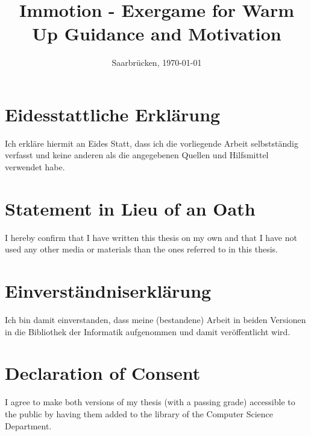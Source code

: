 \documentclass[11pt, a4paper, twoside]{Thesis}
\date{\displaydate{date1}}
\date{\displaydate{date2}}
\begin{document}




\frontmatter

\title  {Immotion - Exergame for Warm Up Guidance and Motivation}

\addresses  {\groupname\\\deptname\\\univname}  %
\date       {Saarbr\"ucken, \today }
\subject    {}
\keywords   {}

\maketitle



\thispagestyle{empty}
\setcounter{tocdepth}{5}
\section*{Eidesstattliche Erkl\"{a}rung}
Ich erkl\"{a}re hiermit an Eides Statt, dass ich die vorliegende Arbeit selbstst\"{a}ndig verfasst und keine
anderen als die angegebenen Quellen und Hilfsmittel verwendet habe.

\vspace{0.60cm}
\section*{Statement in Lieu of an Oath}
I hereby confirm that I have written this thesis on my own and that I have not used any other media or
materials than the ones referred to in this thesis.
\vspace{1.5cm}

\section*{Einverst\"{a}ndniserkl\"{a}rung}
Ich bin damit einverstanden, dass meine (bestandene) Arbeit in beiden Versionen in die Bibliothek der
Informatik aufgenommen und damit ver\"{o}ffentlicht wird.

\vspace{0.60cm}
\section*{Declaration of Consent}
I agree to make both versions of my thesis (with a passing grade) accessible to the public by having
them added to the library of the Computer Science Department.
\vspace{3cm}
\end{document}
